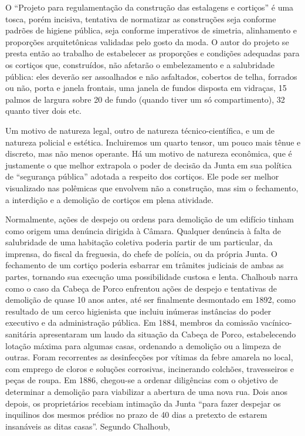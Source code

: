O ``Projeto para regulamentação da construção das estalagens e
cortiços'' é uma tosca, porém incisiva, tentativa de normatizar as
construções seja conforme padrões de higiene pública, seja conforme
imperativos de simetria, alinhamento e proporções arquitetônicas
validadas pelo gosto da moda. O autor do projeto se presta então ao
trabalho de estabelecer as proporções e condições adequadas para os
cortiços que, construídos, não afetarão o embelezamento e a salubridade
pública: eles deverão ser assoalhados e não asfaltados, cobertos de
telha, forrados ou não, porta e janela frontais, uma janela de fundos
disposta em vidraças, 15 palmos de largura sobre 20 de fundo (quando
tiver um só compartimento), 32 quanto tiver dois etc.

Um motivo de natureza legal, outro de natureza técnico-científica, e um
de natureza policial e estética. Incluiremos um quarto tensor, um pouco
mais tênue e discreto, mas não menos operante. Há um motivo de natureza
econômica, que é justamente o que melhor extrapola o poder de decisão da
Junta em sua política de ``segurança pública'' adotada a respeito dos
cortiços. Ele pode ser melhor visualizado nas polêmicas que envolvem não
a construção, mas sim o fechamento, a interdição e a demolição de
cortiços em plena atividade.

Normalmente, ações de despejo ou ordens para demolição de um edifício
tinham como origem uma denúncia dirigida à Câmara. Qualquer denúncia à
falta de salubridade de uma habitação coletiva poderia partir de um
particular, da imprensa, do fiscal da freguesia, do chefe de polícia, ou
da própria Junta. O fechamento de um cortiço poderia esbarrar em
trâmites judiciais de ambas as partes, tornando sua execução uma
possibilidade custosa e lenta. Chalhoub narra como o caso da Cabeça de
Porco enfrentou ações de despejo e tentativas de demolição de quase 10
anos antes, até ser finalmente desmontado em 1892, como resultado de um
cerco higienista que incluiu inúmeras instâncias do poder executivo e da
administração pública. Em 1884, membros da comissão vacínico-sanitária
apresentaram um laudo da situação da Cabeça de Porco, estabelecendo
lotação máxima para algumas casas, ordenando a demolição ou a limpeza de
outras. Foram recorrentes as desinfecções por vítimas da febre amarela
no local, com emprego de cloros e soluções corrosivas, incinerando
colchões, travesseiros e peças de roupa. Em 1886, chegou-se a ordenar
diligências com o objetivo de determinar a demolição para viabilizar a
abertura de uma nova rua. Dois anos depois, os proprietários recebiam
intimação da Junta ``para fazer despejar os inquilinos dos mesmos
prédios no prazo de 40 dias a pretexto de estarem insanáveis as ditas
casas''. Segundo Chalhoub,

